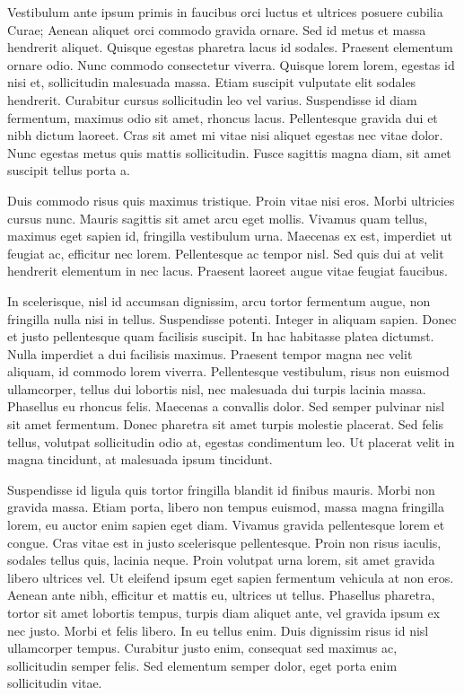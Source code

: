 Vestibulum ante ipsum primis in faucibus orci luctus et ultrices posuere cubilia Curae; Aenean aliquet orci commodo gravida ornare. Sed id metus et massa hendrerit aliquet. Quisque egestas pharetra lacus id sodales. Praesent elementum ornare odio. Nunc commodo consectetur viverra. Quisque lorem lorem, egestas id nisi et, sollicitudin malesuada massa. Etiam suscipit vulputate elit sodales hendrerit. Curabitur cursus sollicitudin leo vel varius. Suspendisse id diam fermentum, maximus odio sit amet, rhoncus lacus. Pellentesque gravida dui et nibh dictum laoreet. Cras sit amet mi vitae nisi aliquet egestas nec vitae dolor. Nunc egestas metus quis mattis sollicitudin. Fusce sagittis magna diam, sit amet suscipit tellus porta a.

Duis commodo risus quis maximus tristique. Proin vitae nisi eros. Morbi ultricies cursus nunc. Mauris sagittis sit amet arcu eget mollis. Vivamus quam tellus, maximus eget sapien id, fringilla vestibulum urna. Maecenas ex est, imperdiet ut feugiat ac, efficitur nec lorem. Pellentesque ac tempor nisl. Sed quis dui at velit hendrerit elementum in nec lacus. Praesent laoreet augue vitae feugiat faucibus.

In scelerisque, nisl id accumsan dignissim, arcu tortor fermentum augue, non fringilla nulla nisi in tellus. Suspendisse potenti. Integer in aliquam sapien. Donec et justo pellentesque quam facilisis suscipit. In hac habitasse platea dictumst. Nulla imperdiet a dui facilisis maximus. Praesent tempor magna nec velit aliquam, id commodo lorem viverra. Pellentesque vestibulum, risus non euismod ullamcorper, tellus dui lobortis nisl, nec malesuada dui turpis lacinia massa. Phasellus eu rhoncus felis. Maecenas a convallis dolor. Sed semper pulvinar nisl sit amet fermentum. Donec pharetra sit amet turpis molestie placerat. Sed felis tellus, volutpat sollicitudin odio at, egestas condimentum leo. Ut placerat velit in magna tincidunt, at malesuada ipsum tincidunt.

Suspendisse id ligula quis tortor fringilla blandit id finibus mauris. Morbi non gravida massa. Etiam porta, libero non tempus euismod, massa magna fringilla lorem, eu auctor enim sapien eget diam. Vivamus gravida pellentesque lorem et congue. Cras vitae est in justo scelerisque pellentesque. Proin non risus iaculis, sodales tellus quis, lacinia neque. Proin volutpat urna lorem, sit amet gravida libero ultrices vel. Ut eleifend ipsum eget sapien fermentum vehicula at non eros. Aenean ante nibh, efficitur et mattis eu, ultrices ut tellus. Phasellus pharetra, tortor sit amet lobortis tempus, turpis diam aliquet ante, vel gravida ipsum ex nec justo. Morbi et felis libero. In eu tellus enim. Duis dignissim risus id nisl ullamcorper tempus. Curabitur justo enim, consequat sed maximus ac, sollicitudin semper felis. Sed elementum semper dolor, eget porta enim sollicitudin vitae.

